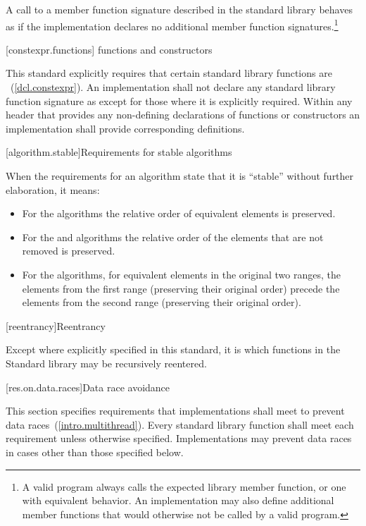 \pnum
A call to a member function signature described in the \Cpp standard library
behaves as if the implementation declares no additional member
function signatures.\footnote{A valid \Cpp program always calls the expected library
member function, or one with equivalent behavior.
An implementation may also
define additional member functions that would otherwise not be called by a
valid \Cpp program.}

[constexpr.functions]{ functions and constructors}

\pnum
This standard explicitly requires that certain standard library functions are
~(\ref{dcl.constexpr}). An implementation shall not declare
any standard library function signature as  except for those where
it is explicitly required.
Within any header that provides any non-defining declarations of 
functions or constructors an implementation shall provide corresponding definitions.

[algorithm.stable]{Requirements for stable algorithms}

\pnum
{}%
%
When the requirements for an algorithm state that it is ``stable'' without further elaboration,
it means:

\begin{itemize}
\item For the  algorithms the relative order of equivalent
elements is preserved.

\item For the  and  algorithms the relative order of
the elements that are not removed is preserved.

\item For the  algorithms, for equivalent elements in
the original two ranges, the elements from the first range (preserving their
original order) precede the elements from the second range (preserving their
original order).
\end{itemize}

[reentrancy]{Reentrancy}

\pnum
Except where explicitly specified in this standard, it is  which functions in the Standard \Cpp
library may be recursively reentered.

[res.on.data.races]{Data race avoidance}

\pnum
This section specifies requirements that implementations shall meet to prevent data
races~(\ref{intro.multithread}).
Every standard library function shall meet each requirement unless otherwise specified.
Implementations may prevent data races in cases other than those specified below.

